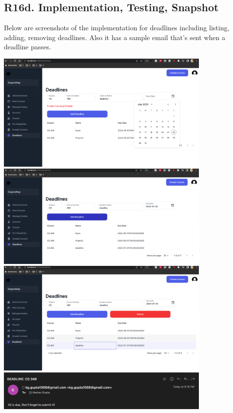 \documentclass[12pt, a4paper]{article}
\begin{document}
\subsection*{R16d. Implementation, Testing, Snapshot}
Below are screenshots of the implementation for deadlines including listing, adding, removing deadlines. Also it has a sample email that's sent when a deadline passes.
\begin{center}
    \includegraphics[width=400px]{R16/i1}
    \includegraphics[width=400px]{R16/i2}
    \includegraphics[width=400px]{R16/i3}
    \includegraphics[width=400px]{R16/i4}
\end{center}
\end{document}
